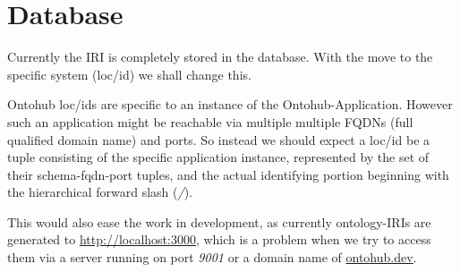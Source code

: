 \documentclass[a4paper,11pt,DIV=25]{scrartcl}
\begin{document}
\section{Database}

Currently the IRI is completely stored in the database. With the move to the
specific system (loc/id) we shall change this.

Ontohub loc/ids are specific to an instance of the Ontohub-Application. However
such an application might be reachable via multiple multiple FQDNs (full
qualified domain name) and ports. So instead we should expect a loc/id be a
tuple consisting of the specific application instance, represented by the set
of their schema-fqdn-port tuples, and the actual identifying portion
beginning with the hierarchical forward slash (\textit{/}).

This would also ease the work in development, as currently ontology-IRIs are
generated to \url{http://localhost:3000}, which is a problem when we try to
access them via a server running on port \textit{9001} or a domain name of
\url{ontohub.dev}.
\end{document}
